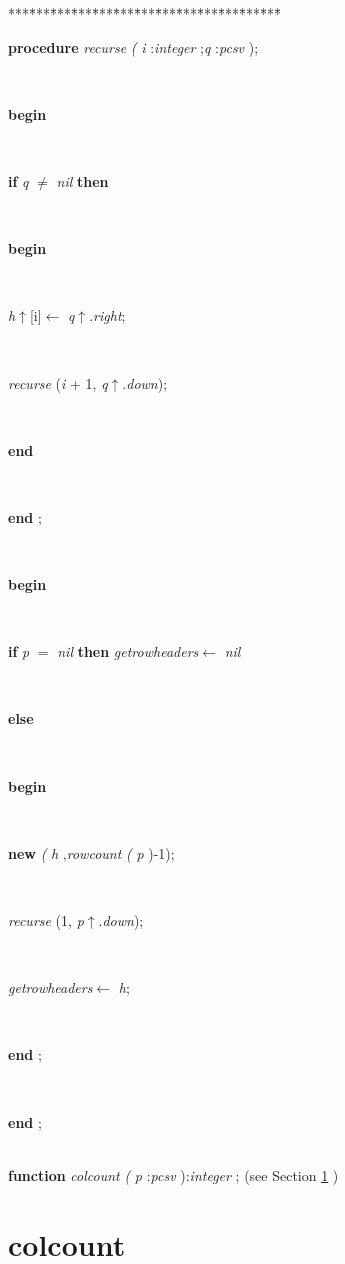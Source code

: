 \begin{tabbing}
***\=***\=***\=***\=***\=***\=***\=***\=***\=***\=***\=***\=***\=\kill
\parbox{14cm}{\textsf{\textbf{procedure}  \textit{recurse} \textit{(} \textit{i} :\textit{integer} ;\textit{q} :\textit{pcsv} );}}\\
\+\parbox{14cm}{\textsf{\textbf{begin} }}\\
\+\parbox{14cm}{\textsf {\textbf {if } \textsf{\textit{q} $\neq$ \textit{nil}} \textbf{ then } }}\\
\<\parbox{14cm}{\textsf{\textbf{begin} }}\\
\parbox{14cm}{\textsf{\textit{h}$\uparrow$\textit{}[i]$\leftarrow$ \textit{q}$\uparrow$.\textit{right}}; }\\
\parbox{14cm}{\textsf{\textit{recurse} (\textit{i} + 1, \textit{q}$\uparrow$.\textit{down})}; }\\
\<\-\parbox{14cm}{\textsf{\textbf{end} }}\\
\<\-\parbox{14cm}{\textsf{\textbf{end} ;}}\\
\+\parbox{14cm}{\textsf{\textbf{begin} }}\\
\+\parbox{14cm}{\textsf {\textbf {if } \textsf{\textit{p} $=$ \textit{nil}} \textbf{ then } \textsf{\textit{getrowheaders}$\leftarrow$ \textit{nil}}}}\\
\<\parbox{14cm}{\textsf{\textbf{else} }}\\
\<\parbox{14cm}{\textsf{\textbf{begin} }}\\
\parbox{14cm}{\textsf{\textbf{new} \textit{(} \textit{h} ,\textit{rowcount} \textit{(} \textit{p} )-1);}}\\
\parbox{14cm}{\textsf{\textit{recurse} (1, \textit{p}$\uparrow$.\textit{down})}; }\\
\parbox{14cm}{\textsf{\textit{getrowheaders}$\leftarrow$ \textit{h}}; }\\
\<\-\parbox{14cm}{\textsf{\textbf{end} ;}}\\
\<\-\parbox{14cm}{\textsf{\textbf{end} ;}}\\
\+\textsf{\textbf{function}  \textit{colcount} \textit{(} \textit{p} :\textit{pcsv} ):\textit{integer} ;} (see Section \ref{sec:csvfilereader/getdatamatrix/recursedown/recurse/getcolheaders/recurse/getrowheaders/recursecolcount} )\\
\end{tabbing}
\section{colcount}\label{sec:csvfilereader/getdatamatrix/recursedown/recurse/getcolheaders/recurse/getrowheaders/recursecolcount}

